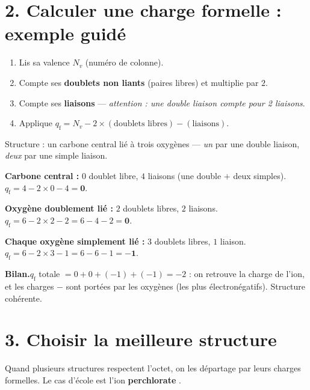 \documentclass[11pt,a4paper]{article}
\newcommand{\CF}{\ensuremath{q_{\mathrm{f}}}}
\begin{document}
\section*{2. Calculer une charge formelle : exemple guidé}

\begin{methbox}
\begin{enumerate}[leftmargin=1.7em,topsep=1pt,itemsep=1pt]
  \item Lis sa valence $N_v$ (numéro de colonne).
  \item Compte ses \textbf{doublets non liants} (paires libres) et multiplie par $2$.
  \item Compte ses \textbf{liaisons} — \emph{attention : une double liaison compte pour 2 liaisons}.
  \item Applique $\CF = N_v - 2\times(\text{doublets libres}) - (\text{liaisons})$.
\end{enumerate}
\end{methbox}

\begin{exbox}
Structure : un carbone central lié à trois oxygènes — \emph{un}  par une double liaison,
\emph{deux}  par une simple liaison.

\smallskip
\textbf{Carbone central :} $0$ doublet libre, $4$ liaisons (une double $+$ deux simples).\;
$\CF = 4 - 2\times 0 - 4 = \mathbf{0}.$

\smallskip
\textbf{Oxygène doublement lié :} $2$ doublets libres, $2$ liaisons.\;
$\CF = 6 - 2\times 2 - 2 = 6 - 4 - 2 = \mathbf{0}.$

\smallskip
\textbf{Chaque oxygène simplement lié :} $3$ doublets libres, $1$ liaison.\;
$\CF = 6 - 2\times 3 - 1 = 6 - 6 - 1 = \mathbf{-1}.$

\smallskip
\textbf{Bilan.}\quad $\CF$ totale $= 0 + 0 + (-1) + (-1) = -2$ : on retrouve la charge de l'ion, et
les charges $-$ sont portées par les oxygènes (les plus électronégatifs). Structure cohérente.
\end{exbox}

\section*{3. Choisir la meilleure structure}

Quand plusieurs structures respectent l'octet, on les départage par leurs charges formelles. Le cas
d'école est l'ion \textbf{perchlorate} .
\end{document}
